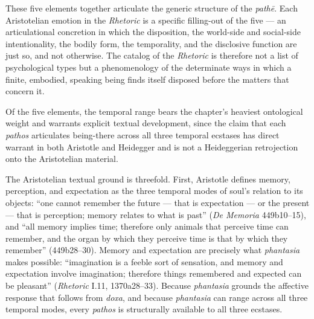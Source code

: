 These five elements together articulate the generic structure of the \textit{pathē}. Each Aristotelian emotion in the \textit{Rhetoric} is a specific filling-out of the five --- an articulational concretion in which the disposition, the world-side and social-side intentionality, the bodily form, the temporality, and the disclosive function are just so, and not otherwise. The catalog of the \textit{Rhetoric} is therefore not a list of psychological types but a phenomenology of the determinate ways in which a finite, embodied, speaking being finds itself disposed before the matters that concern it.

Of the five elements, the temporal range bears the chapter's heaviest ontological weight and warrants explicit textual development, since the claim that each \textit{pathos} articulates being-there across all three temporal ecstases has direct warrant in both Aristotle and Heidegger and is not a Heideggerian retrojection onto the Aristotelian material.

The Aristotelian textual ground is threefold. First, Aristotle defines memory, perception, and expectation as the three temporal modes of soul's relation to its objects: ``one cannot remember the future --- that is expectation --- or the present --- that is perception; memory relates to what is past'' (\textit{De Memoria} 449b10--15), and ``all memory implies time; therefore only animals that perceive time can remember, and the organ by which they perceive time is that by which they remember'' (449b28--30). Memory and expectation are precisely what \textit{phantasia} makes possible: ``imagination is a feeble sort of sensation, and memory and expectation involve imagination; therefore things remembered and expected can be pleasant'' (\textit{Rhetoric} I.11, 1370a28--33). Because \textit{phantasia} grounds the affective response that follows from \textit{doxa}, and because \textit{phantasia} can range across all three temporal modes, every \textit{pathos} is structurally available to all three ecstases.


